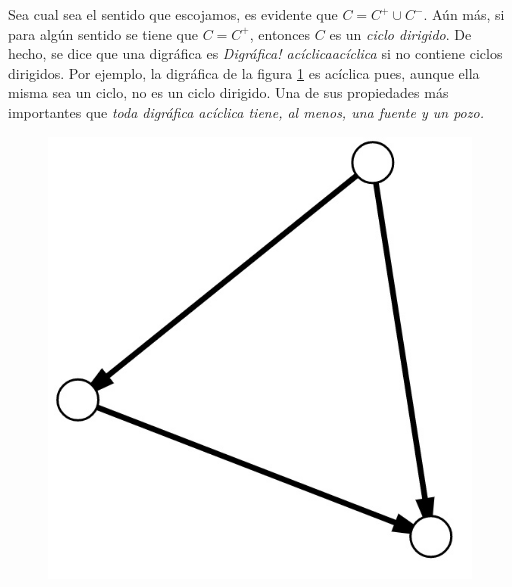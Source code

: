 Sea cual sea el sentido que escojamos, es evidente que $C = C^{+} \cup C^{-}$. Aún más, si para algún sentido se tiene que $C=C^{+}$, entonces $C$ es un \textit{ciclo dirigido}. De hecho, se dice que una digráfica es \textit{Digráfica! acíclica}\textit{acíclica} si no contiene ciclos dirigidos. Por ejemplo, la digráfica de la figura \ref{fig:digrafoaciclico} es acíclica pues, aunque ella misma sea un ciclo, no es un ciclo dirigido. Una de sus propiedades más importantes que \textit{toda digráfica acíclica tiene, al menos, una fuente y un pozo.}


\begin{figure}[H]
 \centering
  \includegraphics[scale=0.22]{img/imgchapter1/digrafoaciclico.jpg}
  \caption{}
  \label{fig:digrafoaciclico}
\end{figure}
